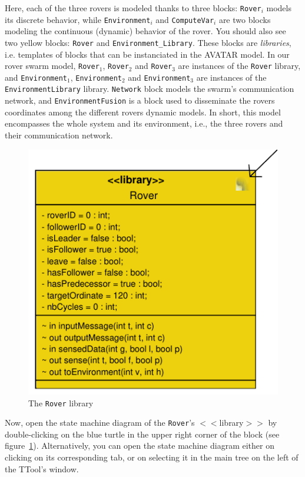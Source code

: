 \documentclass{article}
\begin{document}
Here, each of the three rovers is modeled thanks to three blocks: \texttt{Rover$_i$} models its discrete behavior, while \texttt{Environment$_i$} and \texttt{ComputeVar$_i$} are two blocks modeling the continuous (dynamic) behavior of the rover. You should also see two yellow blocks: \texttt{Rover} and \texttt{Environment\_Library}. These blocks are \emph{libraries}, i.e. templates of blocks that can be instanciated in the AVATAR model. In our rover swarm model, \texttt{Rover$_1$}, \texttt{Rover$_2$} and \texttt{Rover$_3$} are instances of the \texttt{Rover} library, and \texttt{Environment$_1$}, \texttt{Environment$_2$} and \texttt{Environment$_3$} are instances of the \texttt{EnvironmentLibrary} library. \texttt{Network} block models the swarm's communication network, and \texttt{EnvironmentFusion} is a block used to disseminate the rovers coordinates among the different rovers dynamic models. In short, this model encompasses the whole system and its environment, i.e., the three rovers and their communication network.

\begin{figure}
	\centering
	\includegraphics[scale=.6]{figures/roverlibrary.pdf}
	\caption{The \texttt{Rover} library}
	\label{fig:opensmd}
\end{figure}

Now, open the state machine diagram of the \texttt{Rover}'s $<<$library$>>$  by double-clicking on the blue turtle in the upper right corner of the block (see figure~\ref{fig:opensmd}). Alternatively, you can open the state machine diagram either on clicking on its corresponding tab, or on selecting it in the main tree on the left of the TTool's window. 
\end{document}
